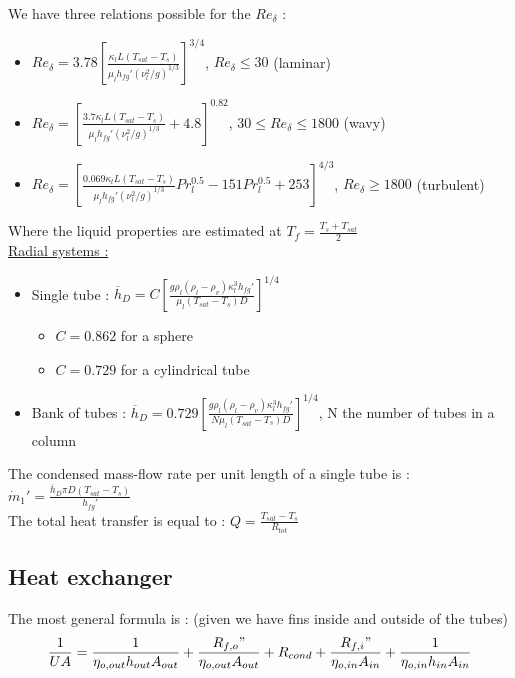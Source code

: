 \documentclass[../main.tex]{subfiles}
\begin{document}
We have three relations possible for the $Re_\delta$ : \begin{itemize}
    \item $Re_\delta = 3.78 [\frac{\kappa_l L (T_{sat} - T_s)}{\mu_l h_{fg}' (\nu_l^2/g)^{1/3}}]^{3/4}$, $Re_\delta \leq 30$ (laminar)\\
    \item $Re_\delta = [\frac{3.7 \kappa_l L (T_{sat} - T_s)}{\mu_l h_{fg}' (\nu_l^2/g)^{1/3}} + 4.8]^{0.82}$, $30 \leq Re_\delta \leq 1800$ (wavy)\\
    \item $Re_\delta = [\frac{0.069 \kappa_l L (T_{sat} - T_s)}{\mu_l h_{fg}' (\nu_l^2/g)^{1/3}}Pr_l^{0.5} - 151 Pr_l^{0.5}+253]^{4/3}$, $Re_\delta \geq 1800$ (turbulent)\\
\end{itemize}

Where the liquid properties are estimated at $T_f = \frac{T_s + T_{sat}}{2}$\\

\quad \underline{Radial systems :}\\

\begin{itemize}
    \item Single tube : $\overline{h}_D = C[\frac{g \rho_l (\rho_l - \rho_v) \kappa_l^3 h_{fg}'}{\mu_l (T_{sat} - T_s)D}]^{1/4}$ \begin{itemize}
        \item $C = 0.862$ for a sphere\\
        \item $C = 0.729$ for a cylindrical tube\\
    \end{itemize}
    \item Bank of tubes : $\overline{h}_D = 0.729[\frac{g \rho_l (\rho_l - \rho_v) \kappa_l^3 h_{fg}'}{N \mu_l (T_{sat} - T_s)D}]^{1/4}$, N the number of tubes in a column\\
\end{itemize}

The condensed mass-flow rate per unit length of a single tube is : $\dot{m}_1' = \frac{\overline{h}_D \pi D (T_{sat}-T_s)}{h_{fg}'}$\\

The total heat transfer is equal to : $Q = \frac{T_{sat}-T_s}{R_{tot}}$\\

\subsection{Heat exchanger}
The most general formula is : (given we have fins inside and outside of the tubes) \begin{equation}
    \frac{1}{UA} = \frac{1}{\eta_{o,out} h_{out} A_{out}} + \frac{R_{f,o}"}{\eta_{o,out} A_{out}} + R_{cond} + \frac{R_{f,i}"}{\eta_{o,in} A_{in}} + \frac{1}{\eta_{o,in} h_{in} A_{in}}
\end{equation}
\end{document}
